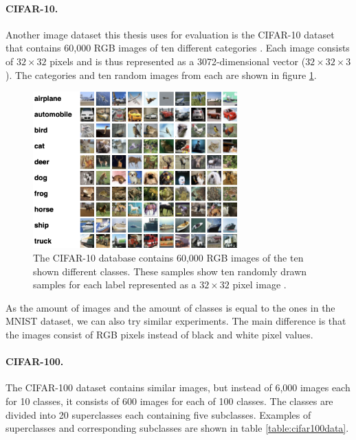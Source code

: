 \paragraph{CIFAR-10.} Another image dataset this thesis uses for evaluation is the CIFAR-10 dataset that contains 60,000 RGB images of ten different categories \cite{Krizhevsky2009LearningML}. Each image consists of $32 \times 32$ pixels and is thus represented as a 3072-dimensional vector ($32 \times 32 \times 3$). The categories and ten random images from each are shown in figure \ref{fig:cifar10}.

\begin{figure}[h]
    \centering
    \includegraphics[width=0.7\textwidth]{images/cifar10}
    \caption{The CIFAR-10 database contains 60,000 RGB images of the ten shown different classes. These samples show ten randomly drawn samples for each label represented as a $32 \times 32$ pixel image \cite{Krizhevsky2009LearningML}.}
    \label{fig:cifar10}
\end{figure}

As the amount of images and the amount of classes is equal to the ones in the MNIST dataset, we can also try similar experiments. The main difference is that the images consist of RGB pixels instead of black and white pixel values.

\paragraph{CIFAR-100.} The CIFAR-100 dataset contains similar images, but instead of 6,000 images each for 10 classes, it consists of 600 images for each of 100 classes. The classes are divided into 20 superclasses each containing five subclasses. Examples of superclasses and corresponding subclasses are shown in table \ref{table:cifar100data}. 

